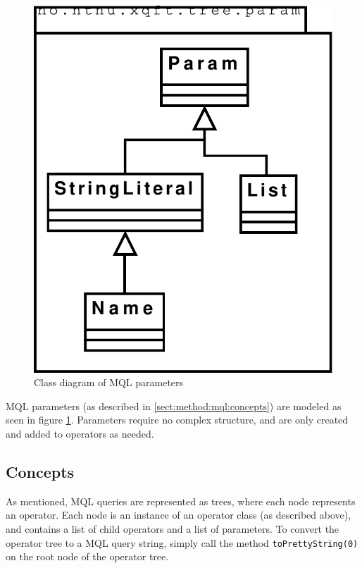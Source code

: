 \begin{figure}[!htp]
\begin{center}
  \includegraphics[scale=0.5]{diagrams/mql_param_uml}
  \caption{Class diagram of MQL parameters}
  \label{fig:impl:mql_param_uml}
\end{center}
\end{figure}

MQL parameters (as described in \ref{sect:method:mql:concepts}) are modeled as
seen in figure \ref{fig:impl:mql_param_uml}. Parameters require no complex
structure, and are only created and added to operators as needed.

\subsection{Concepts}
As mentioned, MQL queries are represented as trees, where each node represents
an operator. Each node is an instance of an operator class (as described
above), and contains a list of child operators and a list of parameters. To
convert the operator tree to a MQL query string, simply call the method
\texttt{toPrettyString(0)} on the root node of the operator tree.


